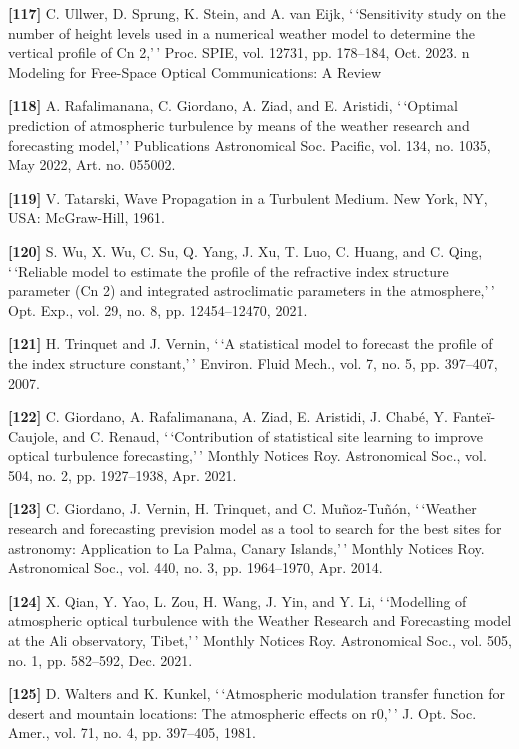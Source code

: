 \documentclass[
]{article}
\begin{document}
\textbf{{[}117{]}} C. Ullwer, D. Sprung, K. Stein, and A. van Eijk,
`\,`Sensitivity study on the number of height levels used in a numerical
weather model to determine the vertical profile of Cn 2,'\,' Proc. SPIE,
vol. 12731, pp. 178--184, Oct. 2023. n Modeling for Free-Space Optical
Communications: A Review

\textbf{{[}118{]}} A. Rafalimanana, C. Giordano, A. Ziad, and E.
Aristidi, `\,`Optimal prediction of atmospheric turbulence by means of
the weather research and forecasting model,'\,' Publications
Astronomical Soc. Pacific, vol. 134, no. 1035, May 2022, Art. no.
055002.

\textbf{{[}119{]}} V. Tatarski, Wave Propagation in a Turbulent Medium.
New York, NY, USA: McGraw-Hill, 1961.

\textbf{{[}120{]}} S. Wu, X. Wu, C. Su, Q. Yang, J. Xu, T. Luo, C.
Huang, and C. Qing, `\,`Reliable model to estimate the profile of the
refractive index structure parameter (Cn 2) and integrated astroclimatic
parameters in the atmosphere,'\,' Opt. Exp., vol. 29, no. 8, pp.
12454--12470, 2021.

\textbf{{[}121{]}} H. Trinquet and J. Vernin, `\,`A statistical model to
forecast the profile of the index structure constant,'\,' Environ. Fluid
Mech., vol. 7, no. 5, pp. 397--407, 2007.

\textbf{{[}122{]}} C. Giordano, A. Rafalimanana, A. Ziad, E. Aristidi,
J. Chabé, Y. Fanteï-Caujole, and C. Renaud, `\,`Contribution of
statistical site learning to improve optical turbulence forecasting,'\,'
Monthly Notices Roy. Astronomical Soc., vol. 504, no. 2, pp. 1927--1938,
Apr. 2021.

\textbf{{[}123{]}} C. Giordano, J. Vernin, H. Trinquet, and C.
Muñoz-Tuñón, `\,`Weather research and forecasting prevision model as a
tool to search for the best sites for astronomy: Application to La
Palma, Canary Islands,'\,' Monthly Notices Roy. Astronomical Soc., vol.
440, no. 3, pp. 1964--1970, Apr. 2014.

\textbf{{[}124{]}} X. Qian, Y. Yao, L. Zou, H. Wang, J. Yin, and Y. Li,
`\,`Modelling of atmospheric optical turbulence with the Weather
Research and Forecasting model at the Ali observatory, Tibet,'\,'
Monthly Notices Roy. Astronomical Soc., vol. 505, no. 1, pp. 582--592,
Dec. 2021.

\textbf{{[}125{]}} D. Walters and K. Kunkel, `\,`Atmospheric modulation
transfer function for desert and mountain locations: The atmospheric
effects on r0,'\,' J. Opt. Soc. Amer., vol. 71, no. 4, pp. 397--405,
1981.
\end{document}

